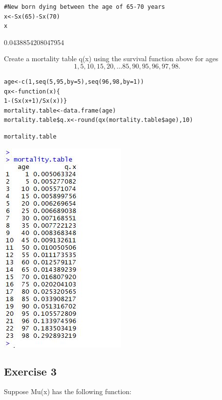 \documentclass[a4paper,12pt]{article}
\begin{document}
\begin{framed} \begin{verbatim}
#New born dying between the age of 65-70 years
x<-Sx(65)-Sx(70)
x

\end{verbatim}\end{framed}


0.0438854208047954


\newpage 

Create a mortality table q(x) using the survival function above for ages
\[1,5,10,15,20,\ldots 85,90,95,96,97,98.\]


\begin{framed} \begin{verbatim}
age<-c(1,seq(5,95,by=5),seq(96,98,by=1))
qx<-function(x){
1-(Sx(x+1)/Sx(x))}
mortality.table<-data.frame(age)
mortality.table$q.x<-round(qx(mortality.table$age),10)
\end{verbatim}\end{framed}

\newpage 
\begin{framed} \begin{verbatim}
mortality.table
\end{verbatim}\end{framed}

\includegraphics[scale=1.5]{00-B2/images/Mortality_2_table.JPG}


\newpage
\subsection*{Exercise 3}
\noident Suppose Mu(x) has the following function:
\end{document}
